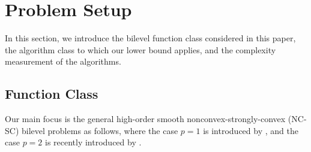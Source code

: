 \documentclass{article}
\begin{document}

\section{Problem Setup}

In this section, we introduce the bilevel function class considered in this paper, the algorithm class to which our lower bound applies, and the complexity measurement of the algorithms.

\subsection{Function Class}

Our main focus is the general high-order smooth nonconvex-strongly-convex (NC-SC) bilevel problems as follows, where the case $p=1$ is introduced by \citet{ghadimi2018approximation}, and the case $p=2$ is recently introduced by \citet{huang2025efficiently}.
\end{document}
